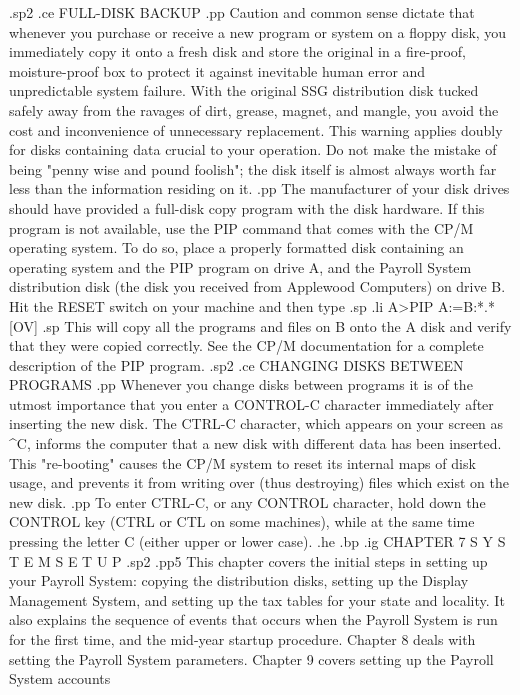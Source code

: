 .sp2
.ce
FULL-DISK BACKUP
.pp
Caution and common sense dictate that whenever you purchase or receive a
new program or system  on a floppy disk, you immediately copy it
onto a fresh disk and store the original in a fire-proof, moisture-proof  box
to protect it against inevitable human error and unpredictable system failure.
With the original SSG distribution disk tucked safely away from the ravages of
dirt, grease, magnet, and mangle, you avoid the cost and inconvenience of
unnecessary replacement.  This warning applies doubly for disks
containing data crucial
to your operation.  Do not make the mistake of being "penny wise and pound
foolish"; the disk itself is almost always worth far less than the information
residing on it.
.pp
The manufacturer of your disk drives should have provided a full-disk copy
program with the disk hardware.  If this program is not available, use the
PIP command that comes with the CP/M operating system. To do so,
place a properly formatted disk containing an
operating system and the PIP program on
drive A, and the Payroll System
distribution disk (the disk you received from Applewood Computers)
on drive B.  Hit the RESET
switch on your machine and then type
.sp
.li
	A>PIP A:=B:*.*[OV]
.sp
This will copy all the programs and files on B onto the A disk and verify
that they were copied correctly.
See the CP/M documentation
for a complete description of the PIP program.
.sp2
.ce
CHANGING DISKS BETWEEN PROGRAMS
.pp
Whenever you change disks between programs it is of the utmost importance
that you enter a CONTROL-C character immediately after inserting the new disk.
The
CTRL-C character, which appears on your screen as ^C, informs the computer
that a new disk with different data has been inserted.	This
"re-booting" causes the CP/M system to reset its internal
maps of disk usage, and prevents it from writing over (thus destroying)
files which exist on the new disk.
.pp
To enter CTRL-C, or any CONTROL character, hold down the CONTROL key (CTRL
or CTL on some machines), while at the same time pressing the letter C
(either upper or lower case).
.he
.bp
.ig
CHAPTER 7
S Y S T E M    S E T U P
.sp2
.pp5
This chapter covers the initial steps in setting up your Payroll System:
copying the distribution disks, setting up the
Display Management System, and setting up the tax tables for your
state and locality.  It also explains the sequence of events that occurs
when the Payroll System is run for the first time, and the mid-year startup
procedure.
Chapter 8 deals with setting the Payroll System
parameters.  Chapter 9 covers setting up the Payroll System accounts
